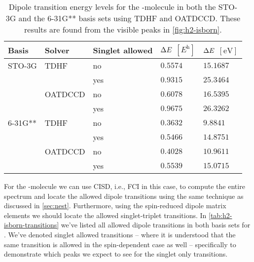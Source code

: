         \begin{table}
            \centering
            \caption{Dipole transition energy levels for the -molecule in
            both the STO-3G and the 6-31G** basis sets using TDHF and OATDCCD.
            These results are found from the visible peaks in
            \autoref{fig:h2-isborn}.}
            \renewcommand{\arraystretch}{1.3}
            \begin{tabular}{@{}lllll@{}}
                \toprule
                Basis & Solver & Singlet allowed
                & $\Delta E$ $[\si{\hartree}]$
                & $\Delta E$ $[\si{\electronvolt}]$
                \\
                \midrule
                STO-3G & TDHF & no & $0.5574$ & $15.1687$ \\
                & & yes & $0.9315$ & $25.3464$ \\
                & OATDCCD& no & $0.6078$ & $16.5395$ \\
                & & yes & $0.9675$ & $26.3262$ \\
                6-31G** & TDHF & no & $0.3632$ & $9.8841$ \\
                & & yes & $0.5466$ & $14.8751$ \\
                & OATDCCD & no & $0.4028$ & $10.9611$ \\
                & & yes & $0.5539$ & $15.0715$ \\
                \bottomrule
            \end{tabular}
            \label{tab:h2-isborn}
        \end{table}
        For the -molecule we can use CISD, i.e., FCI in this case, to
        compute the entire spectrum and locate the allowed dipole transitions
        using the same technique as discussed in \autoref{sec:nest}.
        Furthermore, using the spin-reduced dipole matrix elements we should
        locate the allowed singlet-triplet transitions.
        In \autoref{tab:h2-isborn-transitions} we've listed all allowed
        dipole transitions in both basis sets for .
        We've denoted singlet allowed transitions -- where it is understood that
        the same transition is allowed in the spin-dependent case as well --
        specifically to demonstrate which peaks we expect to see for the singlet
        only transitions.
